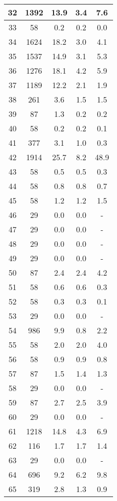 \documentclass[a4paper,10pt]{article}
\begin{document}
\begin{table}
\begin{tabular}{|c|c|c|c|c|}
\hline
32 & 1392 & 13.9 & 3.4 & 7.6 \\
\hline
33 & 58 & 0.2 & 0.2 & 0.0 \\
\hline
34 & 1624 & 18.2 & 3.0 & 4.1 \\
\hline
35 & 1537 & 14.9 & 3.1 & 5.3 \\
\hline
36 & 1276 & 18.1 & 4.2 & 5.9 \\
\hline
37 & 1189 & 12.2 & 2.1 & 1.9 \\
\hline
38 & 261 & 3.6 & 1.5 & 1.5 \\
\hline
39 & 87 & 1.3 & 0.2 & 0.2 \\
\hline
40 & 58 & 0.2 & 0.2 & 0.1 \\
\hline
41 & 377 & 3.1 & 1.0 & 0.3 \\
\hline
42 & 1914 & 25.7 & 8.2 & 48.9 \\
\hline
43 & 58 & 0.5 & 0.5 & 0.3 \\
\hline
44 & 58 & 0.8 & 0.8 & 0.7 \\
\hline
45 & 58 & 1.2 & 1.2 & 1.5 \\
\hline
46 & 29 & 0.0 & 0.0 & - \\
\hline
47 & 29 & 0.0 & 0.0 & - \\
\hline
48 & 29 & 0.0 & 0.0 & - \\
\hline
49 & 29 & 0.0 & 0.0 & - \\
\hline
50 & 87 & 2.4 & 2.4 & 4.2 \\
\hline
51 & 58 & 0.6 & 0.6 & 0.3 \\
\hline
52 & 58 & 0.3 & 0.3 & 0.1 \\
\hline
53 & 29 & 0.0 & 0.0 & - \\
\hline
54 & 986 & 9.9 & 0.8 & 2.2 \\
\hline
55 & 58 & 2.0 & 2.0 & 4.0 \\
\hline
56 & 58 & 0.9 & 0.9 & 0.8 \\
\hline
57 & 87 & 1.5 & 1.4 & 1.3 \\
\hline
58 & 29 & 0.0 & 0.0 & - \\
\hline
59 & 87 & 2.7 & 2.5 & 3.9 \\
\hline
60 & 29 & 0.0 & 0.0 & - \\
\hline
61 & 1218 & 14.8 & 4.3 & 6.9 \\
\hline
62 & 116 & 1.7 & 1.7 & 1.4 \\
\hline
63 & 29 & 0.0 & 0.0 & - \\
\hline
64 & 696 & 9.2 & 6.2 & 9.8 \\
\hline
65 & 319 & 2.8 & 1.3 & 0.9 \\
\hline

\end{tabular}
\end{table}
\end{document}
